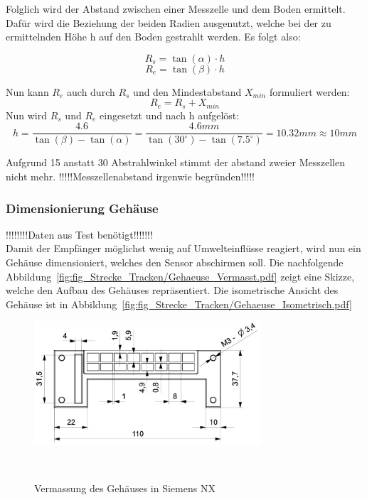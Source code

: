\documentclass[main.tex]{subfiles} %
\begin{document}
Folglich wird der Abstand zwischen einer Messzelle und dem Boden ermittelt. Dafür 
wird die Beziehung der beiden Radien ausgenutzt, welche bei der zu ermittelnden Höhe
h auf den Boden gestrahlt werden. Es folgt also:

\[
R_s = \tan(\alpha) \cdot h 
\]
\[
R_e = \tan(\beta) \cdot h
\]

Nun kann \( R_e \) auch durch \( R_s \) und den Mindestabstand \( X_{min} \) formuliert werden:
\[
    R_e = R_s + X_{min}
\]
Nun wird \( R_s \) und \( R_e \) eingesetzt und nach h aufgelöst:
\[
h = \frac{4.6}{\tan(\beta) - \tan(\alpha)} = \frac{4.6mm}{\tan(30^\circ) - \tan(7.5^\circ)} = 10.32{mm} \approx 10{mm}
\]

Aufgrund 15 anstatt 30 Abstrahlwinkel stimmt der abstand zweier Messzellen nicht mehr.
!!!!!Messzellenabstand irgenwie begründen!!!!!



\subsubsection{Dimensionierung Gehäuse}
!!!!!!!!Daten aus Test benötigt!!!!!!!\\
Damit der Empfänger möglichst wenig auf Umwelteinflüsse reagiert, wird nun ein 
Gehäuse dimensioniert, welches den Sensor abschirmen soll. Die nachfolgende 
Abbildung~\ref{fig:fig_Strecke_Tracken/Gehaeuse_Vermasst.pdf} zeigt eine Skizze, welche den Aufbau des Gehäuses repräsentiert.
Die isometrische Ansicht des Gehäuse ist in Abbildung~\ref{fig:fig_Strecke_Tracken/Gehaeuse_Isometrisch.pdf}



\begin{figure}[H]
    \centering
    \includegraphics[width=0.75\textwidth]{fig_Strecke_Tracken/Gehaeuse_Vermasst.pdf}
    \caption{Vermassung des Gehäuses in Siemens NX}~\label{fig:Gehaeuse_Vermasst}
\end{figure}
\end{document}
